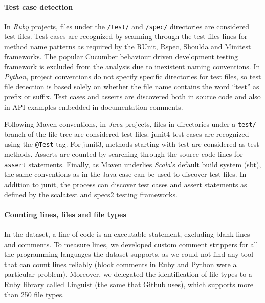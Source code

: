 \documentclass{sig-alternate}
\begin{document}
\paragraph*{Test case detection}
In \emph{Ruby} projects, files under the \texttt{/test/} and \texttt{/spec/}
directories are considered test files. Test cases are recognized by scanning
through the test files lines for method name patterns as required by the
\textsf{RUnit}, \textsf{Rspec}, \textsf{Shoulda} and \textsf{Minitest}
frameworks. The popular Cucumber behaviour driven development testing framework
is excluded from the analysis due to inexistent naming conventions.  In
\emph{Python}, project conventions do not specify specific directories for test
files, so test file detection is based solely on whether the file name contains
the word ``test'' as prefix or suffix. Test cases and asserts are discovered
both in source code and also in API examples embedded in documentation comments. 

Following Maven conventions, in \emph{Java} projects, files in directories under
a \texttt{test/} branch of the file tree are considered test files.
\textsf{junit4} test cases are recognized using the \texttt{@Test} tag. For
\textsf{junit3}, methods starting with test are considered as test methods.
Asserts are counted by searching through the source code lines for
\texttt{assert} statements. Finally, as Maven underlies \emph{Scala}'s default
build system (\textsf{sbt}), the same conventions as in the Java case can be
used to discover test files. In addition to \textsf{junit}, the process can
discover test cases and assert statements as defined by the \textsf{scalatest}
and \textsf{specs2} testing frameworks.


\paragraph*{Counting lines, files and file types}

In the \pullreqs dataset, a line of code is an executable statement,
excluding blank lines and comments. To measure lines, we developed custom
comment strippers for all the programming languages the dataset supports, as
we could not find any tool that can count lines reliably (block comments in Ruby and Python were a particular problem).
Moreover, we delegated the identification of file types to a Ruby library
called Linguist (the same that Github uses), which supports more than 250 file types.
\end{document}
